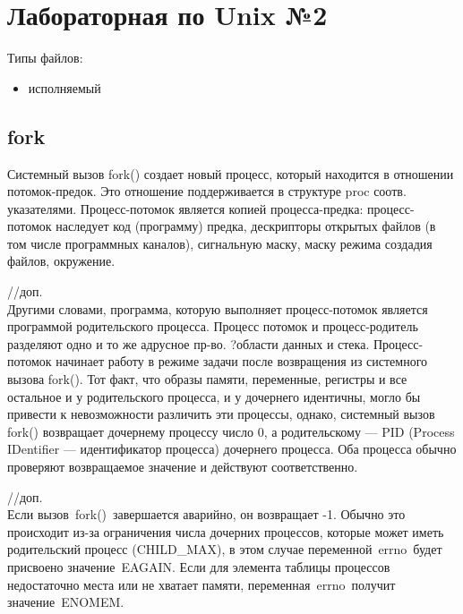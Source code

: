 \chapter{Лабораторная по Unix №2}

Типы файлов:
\begin{itemize}
	\item исполняемый
\end{itemize}
	
\section{fork}
Системный вызов fork() создает новый процесс, который находится в отношении потомок-предок. Это отношение поддерживается в структуре proc соотв. указателями. 
Процесс-потомок является копией процесса-предка: процесс-потомок наследует код (программу) предка, дескрипторы открытых файлов (в том числе программных каналов), сигнальную маску, маску режима создадия файлов, окружение.

//доп.\\
Другими словами, программа, которую выполняет процесс-потомок является программой родительского процесса. Процесс потомок и процесс-родитель разделяют одно и то же адрусное пр-во. ?области данных и стека. Процесс-потомок начинает работу в режиме задачи после возвращения из системного вызова fork(). Тот факт, что образы памяти, переменные, регистры и все остальное и у родительского процесса, и у дочернего идентичны, могло бы привести  к невозможности различить эти процессы, однако, системный вызов fork() возвращает дочернему процессу число 0, а родительскому —  PID (Process IDentifier — идентификатор процесса) дочернего процесса. Оба процесса обычно проверяют возвращаемое значение и действуют соответственно.

//доп.\\
Если вызов fork() завершается аварийно, он возвращает -1. Обычно это происходит из-за ограничения числа дочерних процессов, которые может иметь родительский процесс (CHILD\_MAX), в этом случае переменной errno будет присвоено значение EAGAIN. Если для элемента таблицы процессов недостаточно места или не хватает памяти, переменная errno получит значение ENOMEM.

